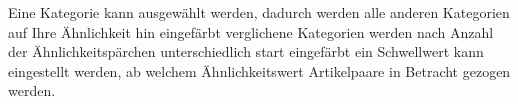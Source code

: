 Eine Kategorie kann ausgewählt werden, dadurch werden alle anderen Kategorien auf Ihre Ähnlichkeit hin eingefärbt
verglichene Kategorien werden nach Anzahl der Ähnlichkeitspärchen unterschiedlich start eingefärbt
ein Schwellwert kann eingestellt werden, ab welchem Ähnlichkeitswert Artikelpaare in Betracht gezogen werden.




    
    
